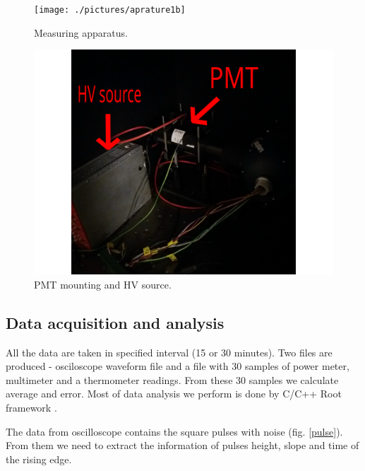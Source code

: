 \begin{figure}[H]
 \centering
 \texttt{[image: ./pictures/aprature1b]}
 \caption{Measuring apparatus.}
 \label{aparature1}
\end{figure}

\begin{figure}[H]
 \centering
 \includegraphics[scale = 0.09]{./pictures/aparature2b}
 \caption{PMT mounting and HV source.}
 \label{aparature2}
\end{figure}


\subsection{Data acquisition and analysis}
All the data are taken in specified interval (15 or 30 minutes). Two files are produced - osciloscope waveform file and a file with 30 samples of power meter, multimeter and a thermometer readings. From these 30 samples we calculate average and error. Most of data analysis we perform is done by C/C++ Root framework \cite{ROOT}.
\par
The data from oscilloscope contains the square pulses with noise (fig. \ref{pulse}). From them we need to extract the information of pulses height, slope and time of the rising edge.

